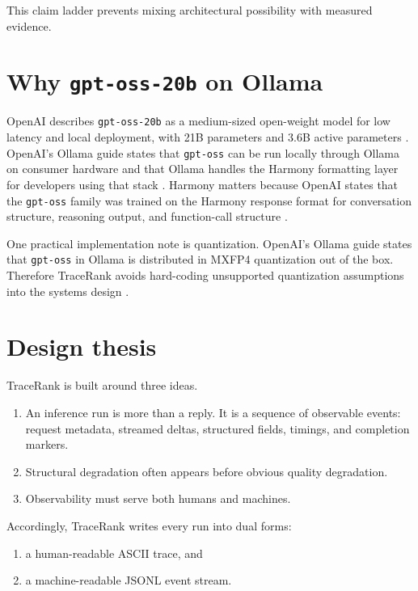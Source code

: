     This claim ladder prevents mixing architectural possibility with measured evidence.
    
    \section{Why \texttt{gpt-oss-20b} on Ollama}
    OpenAI describes \texttt{gpt-oss-20b} as a medium-sized open-weight model for low latency and local deployment, with 21B parameters and 3.6B active parameters \cite{openai_gptoss20b}. OpenAI's Ollama guide states that \texttt{gpt-oss} can be run locally through Ollama on consumer hardware and that Ollama handles the Harmony formatting layer for developers using that stack \cite{openai_ollama_guide}. Harmony matters because OpenAI states that the \texttt{gpt-oss} family was trained on the Harmony response format for conversation structure, reasoning output, and function-call structure \cite{openai_harmony}.
    
    One practical implementation note is quantization. OpenAI's Ollama guide states that \texttt{gpt-oss} in Ollama is distributed in MXFP4 quantization out of the box. Therefore TraceRank avoids hard-coding unsupported quantization assumptions into the systems design \cite{openai_ollama_guide}.
    
    \section{Design thesis}
    TraceRank is built around three ideas.
    \begin{enumerate}[label=\arabic*.]
      \item An inference run is more than a reply. It is a sequence of observable events: request metadata, streamed deltas, structured fields, timings, and completion markers.
      \item Structural degradation often appears before obvious quality degradation.
      \item Observability must serve both humans and machines.
    \end{enumerate}
    
    Accordingly, TraceRank writes every run into dual forms:
    \begin{enumerate}[label=\alph*.]
      \item a human-readable ASCII trace, and
      \item a machine-readable JSONL event stream.
    \end{enumerate}
    
